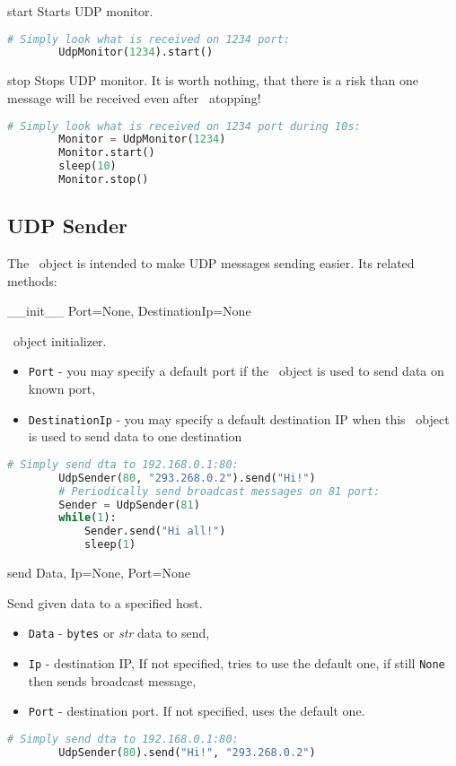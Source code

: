  {start} {} {
	Starts UDP monitor.
}
\begin{lstlisting}[language=Python]
		# Simply look what is received on 1234 port:
		UdpMonitor(1234).start()
\end{lstlisting}

 {stop} {} {
	Stops UDP monitor. It is worth nothing, that there is a risk than one message will be received even after \UdpMonitor\ atopping!
}
\begin{lstlisting}[language=Python]
		# Simply look what is received on 1234 port during 10s:
		Monitor = UdpMonitor(1234)
		Monitor.start()
		sleep(10)
		Monitor.stop()
\end{lstlisting}

\subsection{UDP Sender}

The \UdpSender\ object is intended to make UDP messages sending easier. Its related methods:

 {\_\_init\_\_} {Port=None, DestinationIp=None} {
	\UdpMonitor\ object initializer.
	\begin{itemize}
		\item \texttt{Port} - you may specify a default port if the \UdpSender\ object is used to send data on known port,
		\item \texttt{DestinationIp} - you may specify a default destination IP when this \UdpSender\ object is used to send data to one destination
	\end{itemize}
}
\begin{lstlisting}[language=Python]
		# Simply send dta to 192.168.0.1:80:
		UdpSender(80, "293.268.0.2").send("Hi!")
		# Periodically send broadcast messages on 81 port:
		Sender = UdpSender(81)
		while(1):
			Sender.send("Hi all!")
			sleep(1)
\end{lstlisting}

 {send} {Data, Ip=None, Port=None} {
	Send given data to a specified host.
	\begin{itemize}
		\item \texttt{Data} - \texttt{bytes} or \textit{str} data to send, 
		\item \texttt{Ip} - destination IP, If not specified, tries to use the default one, if still \texttt{None} then sends broadcast message,
		\item \texttt{Port} - destination port. If not specified, uses the default one.
	\end{itemize}
}
\begin{lstlisting}[language=Python]
		# Simply send dta to 192.168.0.1:80:
		UdpSender(80).send("Hi!", "293.268.0.2")
\end{lstlisting}

